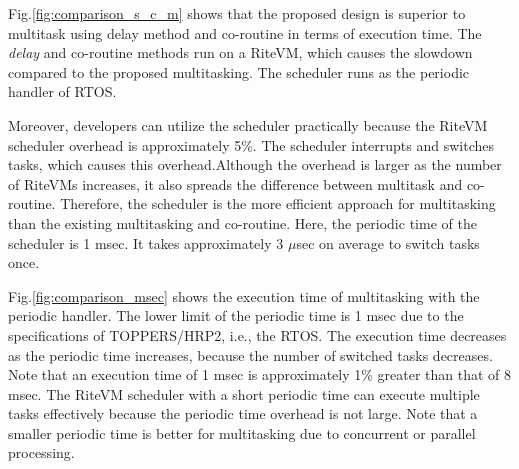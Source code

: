 \documentclass[S,R,E]{article/compsoft}
\begin{document}

{%

Fig.\ref{fig:comparison_s_c_m} shows that the proposed design is superior to multitask using delay method and co-routine in terms of execution time.
The {\it delay} and co-routine methods run on a RiteVM, which causes the slowdown compared to the proposed multitasking.
The scheduler runs as the periodic handler of RTOS.

Moreover, developers can utilize the scheduler practically because the RiteVM scheduler overhead is approximately 5\%.
The scheduler interrupts and switches tasks, which causes this overhead.Although the overhead is larger as the number of RiteVMs increases, it also spreads the difference between multitask and co-routine.
Therefore, the scheduler is the more efficient approach for multitasking than the existing multitasking and co-routine.
Here, the periodic time of the scheduler is 1 msec.
It takes approximately 3 $\mu$sec on average to switch tasks once.


Fig.\ref{fig:comparison_msec} shows the execution time of multitasking with the periodic handler.
The lower limit of the periodic time is 1 msec due to the specifications of TOPPERS/HRP2, i.e., the RTOS.
The execution time decreases as the periodic time increases, because the number of switched tasks decreases.
Note that an execution time of 1 msec is approximately 1\% greater than that of 8 msec.
The RiteVM scheduler with a short periodic time can execute multiple tasks effectively because the periodic time overhead is not large.
Note that a smaller periodic time is better for multitasking due to concurrent or parallel processing.

}
\end{document}
